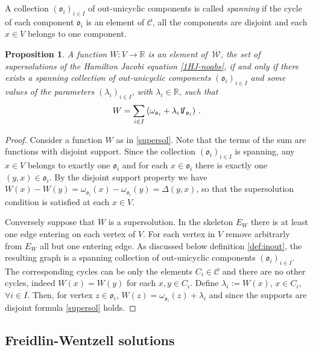 \documentclass[reqno]{amsart}
\theoremstyle{plain}
\newtheorem{proposition}[theorem]{Proposition}
\theoremstyle{definition}
\theoremstyle{remark}
\numberwithin{equation}{section}
\numberwithin{theorem}{section}
\newcommand{\upbar}[1]{\,\overline{\! #1}}
\newcommand{\id}{{1 \mskip -5mu {\rm I}}}
\newcommand{\<}{\langle}
\renewcommand{\>}{\rangle}
\begin{document}
A collection $(\mathfrak o_i)_{i\in I}$ of out-unicyclic components is called {\it spanning} if the cycle of each component $\mathfrak o_i$ is an element of $\mathcal C$, all the components are disjoint and each $x\in V$ belongs to one component.
\begin{proposition}\label{prop:super}
	A function $W:V\to \mathbb R$ is an element of $\upbar {\mathcal W}$, the set of supersolutions of the Hamilton Jacobi equation \eqref{1HJ-noabs}, if and only if there exists a spanning collection of out-unicyclic components $(\mathfrak{o}_{i})_{i\in I}$ and some values of the parameters $(\lambda_{i})_{i\in I}$, with $\lambda_i\in \mathbb R$, such that
	\begin{equation}\label{supersol}
		W=\sum_{i\in I} \left(\omega_{\mathfrak o_i}+\lambda_i \id_{\mathfrak o_i}\right)\,. 
	\end{equation} 
	
\end{proposition}
\begin{proof}
	Consider a function $W$ as in \eqref{supersol}. Note that the terms of the sum are functions with disjoint support. Since the collection $(\mathfrak o_i)_{i\in I}$ is spanning, any $x\in V$ belongs to exactly one $\mathfrak o_i$ and for each $x\in \mathfrak o_i$ there is exactly one $(y,x)\in \mathfrak o_i$. By the disjoint support property we have $W(x)-W(y)=\omega_{\mathfrak o_i}(x)-\omega_{\mathfrak o_i}(y)=\Delta(y,x)$, so that the supersolution condition is satisfied at each $x\in V$.
	
	\smallskip
	
	Conversely suppose that $W$ is a supersolution.  In the skeleton $E_W$ there is at least one edge entering on each vertex of $V$. For each vertex in $V$ remove arbitrarly from $E_W$ all but one entering edge. As discussed below definition \ref{def:inout}, the resulting graph is a  spanning collection of out-unicyclic components $(\mathfrak o_i)_{i\in I}$. The corresponding cycles can be only the elements $C_i\in\mathcal{C}$ and there are no other cycles, indeed $W(x)=W(y)$ for each $x,y\in C_i$. Define $\lambda_i:=W(x)$, $x\in C_i$, $\forall i\in I$. 
	Then, for vertex $z\in \mathfrak o_i$,  $W(z)=\omega_{\mathfrak o_i}(z)+\lambda_i$ and since the supports are disjoint formula \eqref{supersol} holds.
\end{proof}



\subsection{Freidlin-Wentzell solutions}
\end{document}
